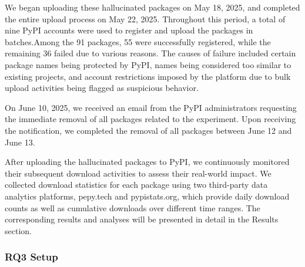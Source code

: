 We began uploading these hallucinated packages on May 18, 2025, and completed the entire upload process on May 22, 2025. Throughout this period, a total of nine 
PyPI accounts were used to register and upload the packages in batches.Among the 91 packages, 55 were successfully registered, while the remaining 36 failed due to 
various reasons. The causes of failure included certain package names being protected by PyPI, names being considered too similar to existing projects, and account 
restrictions imposed by the platform due to bulk upload activities being flagged as suspicious behavior.

On June 10, 2025, we received an email from the PyPI administrators requesting the immediate removal of all packages related to the experiment. Upon receiving the 
notification, we completed the removal of all packages between June 12 and June 13.

After uploading the hallucinated packages to PyPI, we continuously monitored their subsequent download activities to assess their real-world impact. We collected 
download statistics for each package using two third-party data analytics platforms, pepy.tech and pypistats.org, which provide daily download counts as well as 
cumulative downloads over different time ranges. The corresponding results and analyses will be presented in detail in the Results section.


\subsubsection{RQ3 Setup}



